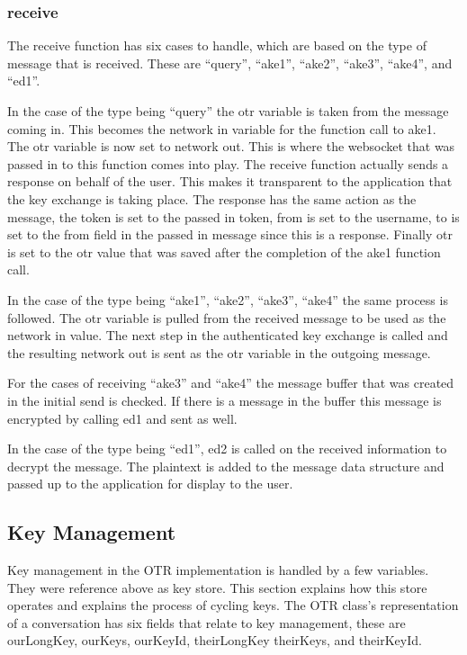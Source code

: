 \subsubsection{receive}


The receive function has six cases to handle, which are based on the type of message that is received. These are “query”, “ake1”, “ake2”, “ake3”, “ake4”, and “ed1”.


In the case of the type being “query” the otr variable is taken from the message coming in. This becomes the network in variable for the function call to ake1. The otr variable is now set to network out. This is where the websocket that was passed in to this function comes into play. The receive function actually sends a response on behalf of the user. This makes it transparent to the application that the key exchange is taking place. The response has the same action as the message, the token is set to the passed in token, from is set to the username, to is set to the from field in the passed in message since this is a response. Finally otr is set to the otr value that was saved after the completion of the ake1 function call.


In the case of the type being “ake1”, “ake2”, “ake3”, “ake4” the same process is followed. The otr variable is pulled from the received message to be used as the network in value. The next step in the authenticated key exchange is called and the resulting network out is sent as the otr variable in the outgoing message.


For the cases of receiving “ake3” and “ake4” the message buffer that was created in the initial send is checked. If there is a message in the buffer this message is encrypted by calling ed1 and sent as well. 


In the case of the type being “ed1”, ed2 is called on the received information to decrypt the message. The plaintext is added to the message data structure and passed up to the application for display to the user.


\subsection{Key Management}


Key management in the OTR implementation is handled by a few variables. They were reference above as key store. This section explains how this store operates and explains the process of cycling keys. The OTR class’s representation of a conversation has six fields that relate to key management, these are ourLongKey, ourKeys, ourKeyId, theirLongKey theirKeys, and theirKeyId. 


